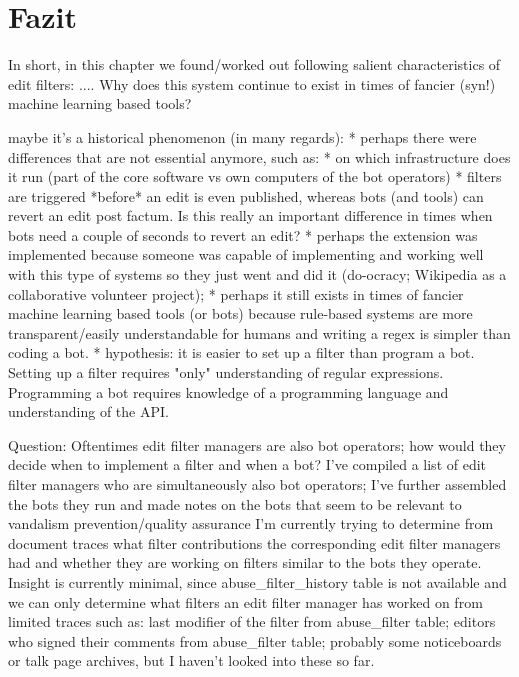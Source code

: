 
\section{Fazit}

In short, in this chapter we found/worked out following salient characteristics of edit filters: ....
Why does this system continue to exist in times of fancier (syn!) machine learning based tools?


maybe it's a historical phenomenon (in many regards):
* perhaps there were differences that are not essential anymore, such as:
  * on which infrastructure does it run (part of the core software vs own computers of the bot operators)
  * filters are triggered *before* an edit is even published, whereas bots (and tools) can revert an edit post factum. Is this really an important difference in times when bots need a couple of seconds to revert an edit?
* perhaps the extension was implemented because someone was capable of implementing and working well with this type of systems so they just went and did it (do-ocracy; Wikipedia as a collaborative volunteer project);
* perhaps it still exists in times of fancier machine learning based tools (or bots) because rule-based systems are more transparent/easily understandable for humans and writing a regex is simpler than coding a bot.
* hypothesis: it is easier to set up a filter than program a bot. Setting up a filter requires "only" understanding of regular expressions. Programming a bot requires knowledge of a programming language and understanding of the API.

Question:
Oftentimes edit filter managers are also bot operators; how would they decide when to implement a filter and when a bot?
I've compiled a list of edit filter managers who are simultaneously also bot operators;
I've further assembled the bots they run and made notes on the bots that seem to be relevant to vandalism prevention/quality assurance
I'm currently trying to determine from document traces what filter contributions the corresponding edit filter managers had and whether they are working on filters similar to the bots they operate.
Insight is currently minimal, since abuse\_filter\_history table is not available and we can only determine what filters an edit filter manager has worked on from limited traces such as: last modifier of the filter from abuse\_filter table; editors who signed their comments from abuse\_filter table; probably some noticeboards or talk page archives, but I haven't looked into these so far.


